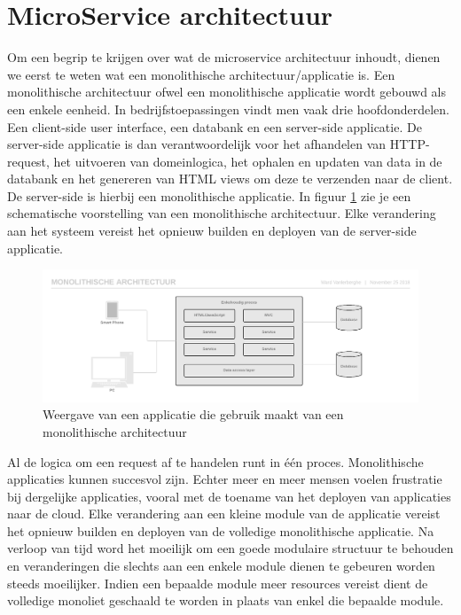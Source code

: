 \section{MicroService architectuur}
Om een begrip te krijgen over wat de microservice architectuur inhoudt, dienen we eerst te weten wat een monolithische architectuur/applicatie is. Een monolithische architectuur ofwel een monolithische applicatie wordt gebouwd als een enkele eenheid. In bedrijfstoepassingen vindt men vaak drie hoofdonderdelen. Een client-side user interface, een databank en een server-side applicatie. De server-side applicatie is dan verantwoordelijk voor het afhandelen van \gls{HTTP-request}, het uitvoeren van domeinlogica, het ophalen en updaten van data in de databank en het genereren van HTML views om deze te verzenden naar de client. De server-side is hierbij een monolithische applicatie. In figuur \ref{fig:monolith} zie je een schematische voorstelling van een monolithische architectuur. Elke verandering aan het systeem vereist het opnieuw builden en deployen van de server-side applicatie.

\begin{figure}
	\includegraphics[width=\linewidth]{img/monolith.png}
	\caption{Weergave van een applicatie die gebruik maakt van een monolithische architectuur}
	\label{fig:monolith}
\end{figure}

Al de logica om een request af te handelen runt in één proces. Monolithische applicaties kunnen succesvol zijn. Echter meer en meer mensen voelen frustratie bij dergelijke applicaties, vooral met de toename van het deployen van applicaties naar de cloud. Elke verandering aan een kleine module van de applicatie vereist het opnieuw builden en deployen van de volledige monolithische applicatie. Na verloop van tijd word het moeilijk om een goede modulaire structuur te behouden en veranderingen die slechts aan een enkele module dienen te gebeuren worden steeds moeilijker. Indien een bepaalde module meer resources vereist dient de volledige monoliet geschaald te worden in plaats van enkel die bepaalde module. \autocite{Fowler2014}

